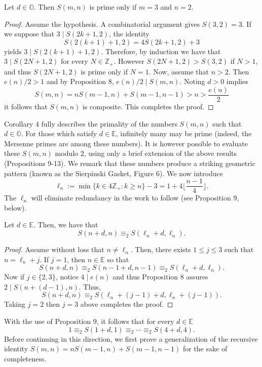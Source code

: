 \documentclass[]{amsart}
\begin{document}
\begin{cor}
Let $d \in \mathbb{O}$.  Then $S(m,n)$ is prime only if $m = 3$ and $n = 2$.
\end{cor}
\begin{proof}
Assume the hypothesis.  A combinatorial argument gives $S(3,2) = 3$.  If we suppose that $3 \mid S(2k+1,2)$, the identity  
\[ S(2(k+1)+1,2) = 4S(2k+1,2) + 3 \]
yields $3 \mid S(2(k+1) + 1,2)$.  Therefore, by induction we have that $3 \mid S(2N+1,2)$ for every $N \in \mathbb{Z}_{+}$.  However $S(2N+1,2) > S(3,2)$ if $N > 1$, and thus $S(2N+1,2)$ is prime only if $N=1$.  Now, assume that $n > 2$.  Then $e(n)/2 > 1$ and by Proposition 8, $e(n)/2 \mid S(m,n)$.  Noting $d > 0$ implies
\[S(m,n) = nS(m-1,n) + S(m-1,n-1) > n > \frac{e(n)}{2} \] 
it follows that $S(m,n)$ is composite. This completes the proof.
\end{proof}
Corollary 4 fully describes the primality of the numbers $S(m,n)$ such that $d \in \mathbb{O}$.  For those which satisfy $d \in \mathbb{E}$, infinitely many may be prime (indeed, the Mersenne primes are among these numbers). It is however possible to evaluate these $S(m,n)$ modulo $2$, using only a brief extension of the above results (Propositions 9-13).  We remark that these numbers produce a striking geometric pattern (known as the Sierpinski Gasket, Figure 6).  We now introduce
\[ \ell_{n} := \min\{k \in 4\mathbb{Z}_{+} : k \geq n\} - 3 = 1 + 4\bigg\lfloor \frac{n-1}{4} \bigg\rfloor. \]
The $\ell_{n}$ will eliminate redundancy in the work to follow (see Proposition 9, below).
\begin{prop}
Let $d \in \mathbb{E}$.  Then, we have that
\[ S(n+d,n) \equiv_{2} S(\ell_{n}+d,\ell_{n}).\]
\end{prop}
\begin{proof}
Assume without loss that $n \neq \ell_{n}$.  Then, there exists $1 \leq j \leq 3$ such that $n  = \ell_{n} + j$.  If $j = 1$, then $n \in \mathbb{E}$ so that
\[ S(n+d,n) \equiv_{2} S(n-1+d,n-1) \equiv_{2} S(\ell_{n}+d,\ell_{n}). \]
Now if $j \in \{2,3\}$, notice $4 \mid e(n)$ and thus Proposition 8 assures $2 \mid S(n+(d-1),n)$.  Thus,
\[ S(n+d,n) \equiv_{2} S(\ell_{n}+(j-1)+d, \ell_{n}+(j-1)). \]
Taking $j=2$ then $j=3$ above completes the proof.
\end{proof}
With the use of Proposition 9, it follows that for every $d \in \mathbb{E}$
\[ 1 \equiv_{2}  S(1+d,1) \equiv_{2} \cdots \equiv_{2} S(4+d,4). \]
Before continuing in this direction, we first prove a generalization of the recursive identity $S(m,n) = nS(m-1,n) + S(m-1,n-1)$ for the sake of completeness.
\end{document}
